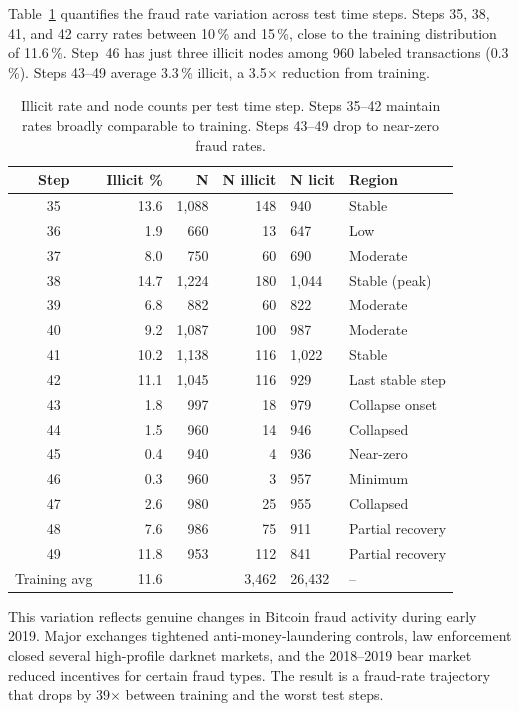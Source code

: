Table~\ref{tab:temporal_rates} quantifies the fraud rate variation
across test time steps.  Steps 35, 38, 41, and 42 carry rates between
10\,\% and 15\,\%, close to the training distribution of 11.6\,\%.
Step~46 has just three illicit nodes among 960 labeled transactions
(0.3\,\%).  Steps 43--49 average 3.3\,\% illicit, a 3.5$\times$
reduction from training.

\begin{table}[!htbp]
\centering
\caption{Illicit rate and node counts per test time step.  Steps 35--42
maintain rates broadly comparable to training.  Steps 43--49 drop to
near-zero fraud rates.}
\label{tab:temporal_rates}
\small
\begin{tabular}{crrrll}
\toprule
\textbf{Step} & \textbf{Illicit \%} & \textbf{N}
  & \textbf{N illicit} & \textbf{N licit} & \textbf{Region} \\
\midrule
35 & 13.6 & 1,088 & 148 & 940  & Stable \\
36 &  1.9 &   660 &  13 & 647  & Low \\
37 &  8.0 &   750 &  60 & 690  & Moderate \\
38 & 14.7 & 1,224 & 180 & 1,044 & Stable (peak) \\
39 &  6.8 &   882 &  60 & 822  & Moderate \\
40 &  9.2 & 1,087 & 100 & 987  & Moderate \\
41 & 10.2 & 1,138 & 116 & 1,022 & Stable \\
42 & 11.1 & 1,045 & 116 & 929  & Last stable step \\
\midrule
43 &  1.8 &   997 &  18 & 979  & Collapse onset \\
44 &  1.5 &   960 &  14 & 946  & Collapsed \\
45 &  0.4 &   940 &   4 & 936  & Near-zero \\
46 &  0.3 &   960 &   3 & 957  & Minimum \\
47 &  2.6 &   980 &  25 & 955  & Collapsed \\
48 &  7.6 &   986 &  75 & 911  & Partial recovery \\
49 & 11.8 &   953 & 112 & 841  & Partial recovery \\
\midrule
Training avg & 11.6 & & 3,462 & 26,432 & -- \\
\bottomrule
\end{tabular}
\end{table}

This variation reflects genuine changes in Bitcoin fraud activity during
early 2019.  Major exchanges tightened anti-money-laundering controls,
law enforcement closed several high-profile darknet markets, and the
2018--2019 bear market reduced incentives for certain fraud types.  The
result is a fraud-rate trajectory that drops by 39$\times$ between
training and the worst test steps.

